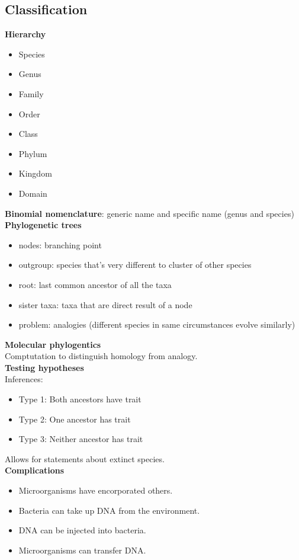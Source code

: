\documentclass{article}
\theoremstyle{sltheorem}
\begin{document}
\subsection{Classification}
\textbf{Hierarchy}
\begin{itemize}
	\item Species
	\item Genus
	\item Family
	\item Order
	\item Class
	\item Phylum
	\item Kingdom
	\item Domain
\end{itemize}
\textbf{Binomial nomenclature}: generic name and specific name (genus and species)\\
\textbf{Phylogenetic trees}
\begin{itemize}
	\item nodes: branching point
	\item outgroup: species that's very different to cluster of other species
	\item root: last common ancestor of all the taxa
	\item sister taxa: taxa that are direct result of a node
	\item problem: analogies (different species in same circumstances evolve similarly)
\end{itemize}
\textbf{Molecular phylogentics}\\
Comptutation to distinguish homology from analogy.\\
\textbf{Testing hypotheses}\\
Inferences:
\begin{itemize}
	\item Type 1: Both ancestors have trait
	\item Type 2: One ancestor has trait
	\item Type 3: Neither ancestor has trait
\end{itemize}
Allows for statements about extinct species.\\
\textbf{Complications}
\begin{itemize}
	\item Microorganisms have encorporated others.
	\item Bacteria can take up DNA from the environment.
	\item DNA can be injected into bacteria.
	\item Microorganisms can transfer DNA.
\end{itemize}
\end{document}
